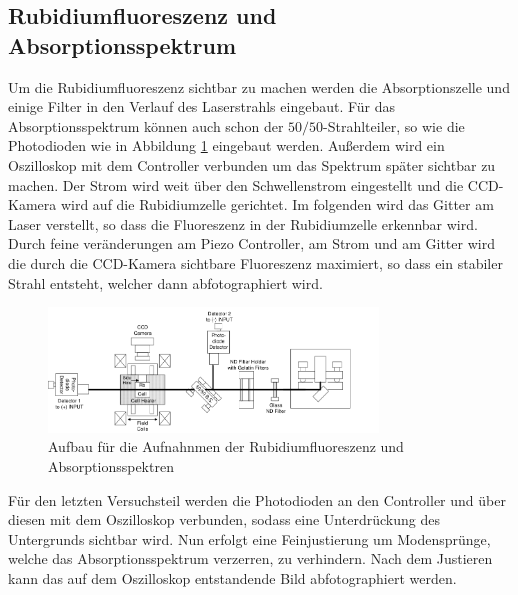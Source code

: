 \subsection{Rubidiumfluoreszenz und Absorptionsspektrum}
Um die Rubidiumfluoreszenz sichtbar zu machen werden die Absorptionszelle und einige Filter in den Verlauf des Laserstrahls eingebaut.
Für das Absorptionsspektrum können auch schon der $50 / 50$-Strahlteiler, so wie die Photodioden wie in Abbildung
\ref{pic:Absorptionsspektrum} eingebaut werden. Außerdem wird ein Oszilloskop mit dem Controller verbunden um das Spektrum später sichtbar zu machen.
Der Strom wird weit über den Schwellenstrom eingestellt und die CCD-Kamera wird auf die Rubidiumzelle gerichtet.
Im folgenden wird das Gitter am Laser verstellt, so dass die Fluoreszenz in der Rubidiumzelle
erkennbar wird. Durch feine veränderungen am Piezo Controller, am Strom und am Gitter wird die durch die CCD-Kamera
sichtbare Fluoreszenz maximiert, so dass ein stabiler Strahl entsteht, welcher dann abfotographiert wird.
\begin{figure}
    \centering
    \includegraphics[width = 0.78\textwidth]{pictures/Aufbau_abs.png}
    \caption{Aufbau für die Aufnahnmen der Rubidiumfluoreszenz und Absorptionsspektren\cite{anleitung}}
    \label{pic:Absorptionsspektrum}
\end{figure}
Für den letzten Versuchsteil werden die Photodioden an den Controller und über diesen mit
dem Oszilloskop verbunden, sodass eine Unterdrückung des Untergrunds sichtbar wird. Nun erfolgt eine Feinjustierung um Modensprünge, welche das Absorptionsspektrum verzerren, zu verhindern.
Nach dem Justieren kann das auf dem Oszilloskop entstandende Bild abfotographiert werden.